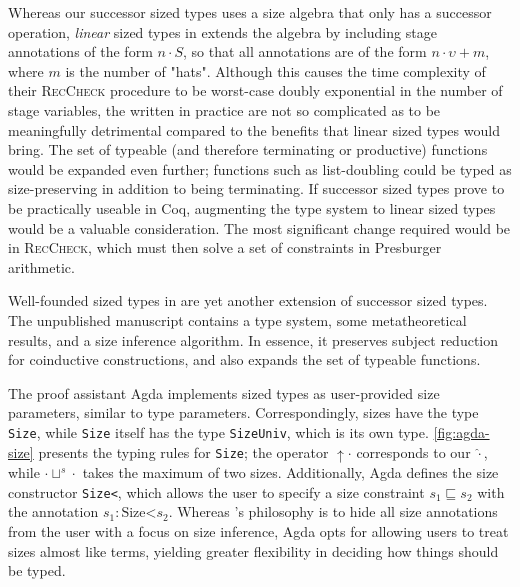\documentclass[nonacm,screen,10pt]{acmart}
\begin{document}
Whereas our successor sized types uses a size algebra that only has a successor operation, \textit{linear} sized types in \CIChatl extends the algebra by including stage annotations of the form $n \cdot S$, so that all annotations are of the form $n \cdot \upsilon + m$, where $m$ is the number of "hats". Although this causes the time complexity of their \textsc{RecCheck} procedure to be worst-case doubly exponential in the number of stage variables, the \cofixpoints written in practice are not so complicated as to be meaningfully detrimental compared to the benefits that linear sized types would bring. The set of typeable (and therefore terminating or productive) functions would be expanded even further; functions such as list-doubling could be typed as size-preserving in addition to being terminating. If successor sized types prove to be practically useable in Coq, augmenting the type system to linear sized types would be a valuable consideration. The most significant change required would be in \textsc{RecCheck}, which must then solve a set of constraints in Presburger arithmetic.

Well-founded sized types in \CIChatsub \cite{wellfounded} are yet another extension of successor sized types. The unpublished manuscript contains a type system, some metatheoretical results, and a size inference algorithm. In essence, it preserves subject reduction for coinductive constructions, and also expands the set of typeable functions.



The proof assistant Agda implements sized types as user-provided size parameters, similar to type parameters. Correspondingly, sizes have the type \texttt{Size}, while \texttt{Size} itself has the type \texttt{SizeUniv}, which is its own type. \autoref{fig:agda-size} presents the typing rules for \texttt{Size}; the operator $\uparrow \cdot$ corresponds to our $\hat{\cdot}$, while $\cdot \sqcup^s \cdot$ takes the maximum of two sizes. Additionally, Agda defines the size constructor \texttt{Size<}, which allows the user to specify a size constraint $s_1 \sqsubseteq s_2$ with the annotation $s_1: \text{Size<} s_2$. Whereas \CIChat's philosophy is to hide all size annotations from the user with a focus on size inference, Agda opts for allowing users to treat sizes almost like terms, yielding greater flexibility in deciding how things should be typed.

\end{document}
